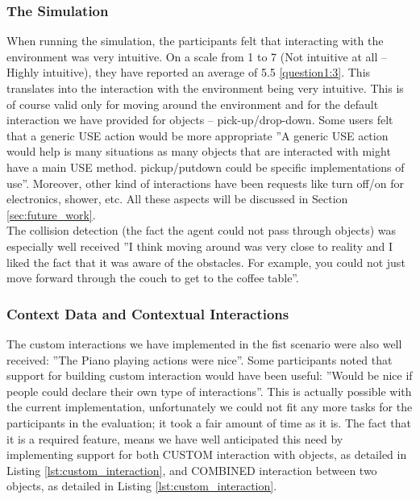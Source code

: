 \subsubsection{The Simulation} %
When running the simulation, the participants felt that interacting with the environment was very intuitive. On a scale from 1 to 7 (Not intuitive at all -- Highly intuitive), they have reported an average of 5.5 \ref{question1:3}. This translates into the interaction with the environment being very intuitive. This is of course valid only for moving around the environment and for the default interaction we have provided for objects -- pick-up/drop-down. Some users felt that a generic USE action would be more appropriate ''A generic USE action would help is many situations as many objects that are interacted with might have a main USE method. pickup/putdown could be specific implementations of use''. Moreover, other kind of interactions have been requests like turn off/on for electronics, shower, etc. All these aspects will be discussed in Section \ref{sec:future_work}.\\

The collision detection (the fact the agent could not pass through objects) was especially well received ''I think moving around was very close to reality and I liked the fact that it was aware of the obstacles. For example, you could not just move forward through the couch to get to the coffee table''.\\

\subsubsection{Context Data and Contextual Interactions} %
The custom interactions we have implemented in the fist scenario were also well received: ''The Piano playing actions were nice''. Some participants noted that support for building custom interaction would have been useful: ''Would be nice if people could declare their own type of interactions''. This is actually possible with the current implementation, unfortunately we could not fit any more tasks for the participants in the evaluation; it took a fair amount of time as it is. The fact that it is a required feature, means we have well anticipated this need by implementing support for both CUSTOM interaction with objects, as detailed in Listing \ref{lst:custom_interaction}, and COMBINED interaction between two objects, as detailed in Listing \ref{lst:custom_interaction}.\\

